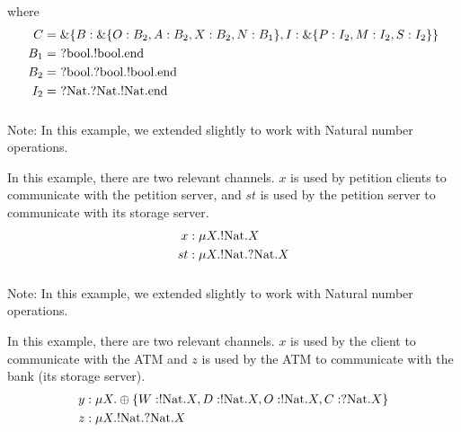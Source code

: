 where
\begin{align*}
C &= \&\{B : \&\{O : B_2, A : B_2, X : B_2, N : B_1\}, I : \&\{P : I_2, M : I_2, S : I_2\}\} \\
B_1 &=\ ? \text{bool} . ! \text{bool} . \text{end}\\
B_2 &=\ ? \text{bool} . ? \text{bool} . ! \text{bool} . \text{end}\\
I_2 &=\ ? \text{Nat} . ? \text{Nat} . ! \text{Nat} . \text{end}\\
\end{align*}

\subsubsection{}
Note: In this example, we extended  slightly to work with Natural number operations.

In this example, there are two relevant channels. $x$ is used by petition clients to communicate with the petition server, and $st$ is used by the petition server to communicate with its storage server.
\begin{align*}
x &: \mu X . ! \text{Nat} . X \\
st &: \mu X . ! \text{Nat} . ? \text{Nat} . X
\end{align*}

\subsubsection{}
Note: In this example, we extended  slightly to work with Natural number operations.

In this example, there are two relevant channels. $x$ is used by the client to communicate with the ATM and $z$ is used by the ATM to communicate with the bank (its storage server).
\begin{align*}
y &: \mu X . \oplus\{W : ! \text{Nat} . X, D : ! \text{Nat} . X, O : ! \text{Nat} . X, C : ? \text{Nat} . X \}\\
z &: \mu X . ! \text{Nat} . ? \text{Nat} . X
\end{align*}

